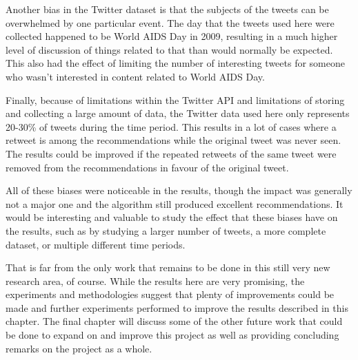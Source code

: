 Another bias in the Twitter dataset is that the subjects of the tweets can be overwhelmed by one particular event. The day that the tweets used here were collected happened to be World AIDS Day in 2009, resulting in a much higher level of discussion of things related to that than would normally be expected. This also had the effect of limiting the number of interesting tweets for someone who wasn't interested in content related to World AIDS Day.

Finally, because of limitations within the Twitter API and limitations of storing and collecting a large amount of data, the Twitter data used here only represents 20-30\% of tweets during the time period. This results in a lot of cases where a retweet is among the recommendations while the original tweet was never seen. The results could be improved if the repeated retweets of the same tweet were removed from the recommendations in favour of the original tweet.

All of these biases were noticeable in the results, though the impact was generally not a major one and the algorithm still produced excellent recommendations. It would be interesting and valuable to study the effect that these biases have on the results, such as by studying a larger number of tweets, a more complete dataset, or multiple different time periods.

That is far from the only work that remains to be done in this still very new research area, of course. While the results here are very promising, the experiments and methodologies suggest that plenty of improvements could be made and further experiments performed to improve the results described in this chapter. The final chapter will discuss some of the other future work that could be done to expand on and improve this project as well as providing concluding remarks on the project as a whole.





